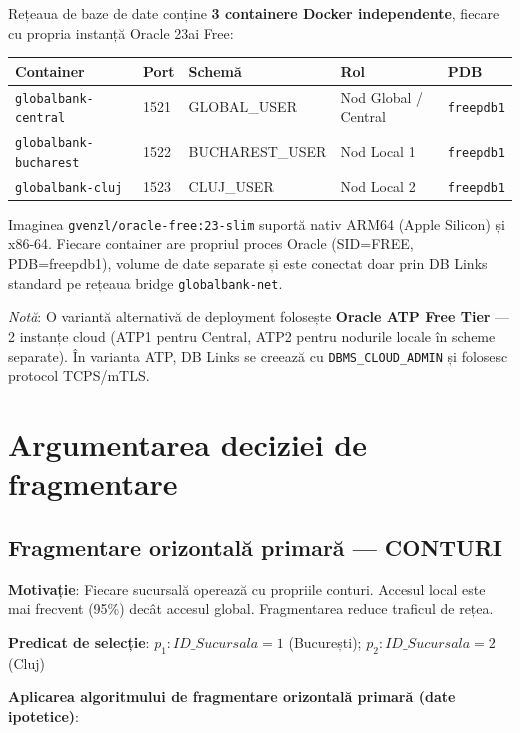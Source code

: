\documentclass[12pt,a4paper]{article}
\begin{document}
Rețeaua de baze de date conține \textbf{3 containere Docker independente}, fiecare cu propria instanță Oracle 23ai Free:

\begin{center}
\begin{tabular}{lllll}
\toprule
\textbf{Container} & \textbf{Port} & \textbf{Schemă} & \textbf{Rol} & \textbf{PDB} \\
\midrule
\texttt{globalbank-central}   & 1521 & GLOBAL\_USER    & Nod Global / Central & \texttt{freepdb1} \\
\texttt{globalbank-bucharest} & 1522 & BUCHAREST\_USER & Nod Local 1          & \texttt{freepdb1} \\
\texttt{globalbank-cluj}      & 1523 & CLUJ\_USER      & Nod Local 2          & \texttt{freepdb1} \\
\bottomrule
\end{tabular}
\end{center}

Imaginea \texttt{gvenzl/oracle-free:23-slim} suportă nativ ARM64 (Apple Silicon) și x86-64.
Fiecare container are propriul proces Oracle (SID=FREE, PDB=freepdb1), volume de date separate
și este conectat doar prin DB Links standard pe rețeaua bridge \texttt{globalbank-net}.

\textit{Notă}: O variantă alternativă de deployment folosește \textbf{Oracle ATP Free Tier} —
2 instanțe cloud (ATP1 pentru Central, ATP2 pentru nodurile locale în scheme separate).
În varianta ATP, DB Links se creează cu \texttt{DBMS\_CLOUD\_ADMIN} și folosesc protocol TCPS/mTLS.

\section{Argumentarea deciziei de fragmentare}

\subsection{Fragmentare orizontală primară — CONTURI}

\textbf{Motivație}: Fiecare sucursală operează cu propriile conturi. Accesul local este mai frecvent
(95\%) decât accesul global. Fragmentarea reduce traficul de rețea.

\textbf{Predicat de selecție}: $p_1: ID\_Sucursala = 1$ (București); $p_2: ID\_Sucursala = 2$ (Cluj)

\textbf{Aplicarea algoritmului de fragmentare orizontală primară (date ipotetice)}:
\end{document}
